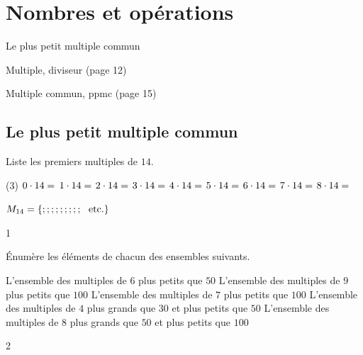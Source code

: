 \documentclass[a4paper,12pt]{report}
\begin{document}
\newcommand{\chapterName}{Nombres et opérations}
\newcommand{\serieName}{Le plus petit multiple commun}


\chapter*{\chapterName}
\thispagestyle{empty}

\begin{amL}{\serieName}{
\item Multiple, diviseur (page 12)
\item Multiple commun, ppmc (page 15)
}\end{amL}

\section*{\serieName}
\setcounter{page}{1}
\thispagestyle{firstPage}








\begin{exop}{
    Liste les premiers multiples de $14$.
\begin{tasks}(3)
\task[] $0\cdot14=\hrulefill$ 
\task[] $1\cdot14=\hrulefill$ 
\task[] $2\cdot14=\hrulefill$ 
\task[] $3\cdot14=\hrulefill$
\task[] $4\cdot14=\hrulefill$ 
\task[] $5\cdot14=\hrulefill$
\task[] $6\cdot14=\hrulefill$ 
\task[] $7\cdot14=\hrulefill$ 
\task[] $8\cdot14=\hrulefill$
\end{tasks}    

$M_{14}=\{\hrulefill;\hrulefill;\hrulefill;\hrulefill;\hrulefill;\hrulefill;\hrulefill;\hrulefill;\hrulefill;  \text{ ~etc.}\}$  
}{1}\end{exop}





\begin{exo}{
    Énumère les éléments de chacun des ensembles suivants.
\begin{tasks}[after-item-skip = 0.5em]
    \task L'ensemble des multiples de $6$ plus petits que $50$
    \task L'ensemble des multiples de $9$ plus petits que $100$
    \task L'ensemble des multiples de $7$ plus petits que $100$
    \task L'ensemble des multiples de $4$ plus grands que $30$ et plus petits que $50$
    \task L'ensemble des multiples de $8$ plus grands que $50$ et plus petits que $100$
\end{tasks}
}{2}\end{exo}
\end{document}
